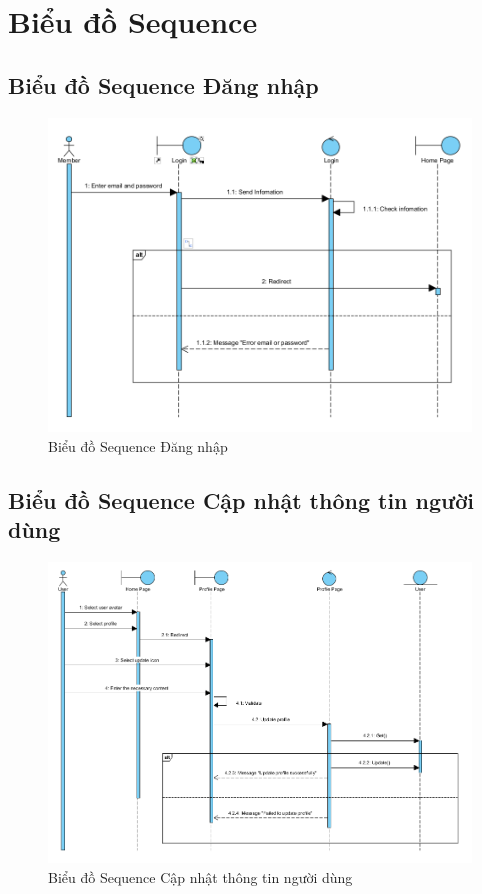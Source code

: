 \documentclass[../index.tex]{subfiles}
\begin{document}
    \section{Biểu đồ Sequence}
    
    \subsection{Biểu đồ Sequence Đăng nhập}
    \begin{figure}[H]
        \centering
        \includegraphics[width=0.8\linewidth]{figures/sequences/sequence-login.png}
        \caption{Biểu đồ Sequence Đăng nhập}
    \end{figure}

    \subsection{Biểu đồ Sequence Cập nhật thông tin người dùng}
    \begin{figure}[H]
        \centering
        \includegraphics[width=0.8\linewidth]{figures/sequences/sequence-update-user.png}
        \caption{Biểu đồ Sequence Cập nhật thông tin người dùng}
    \end{figure}
\end{document}
